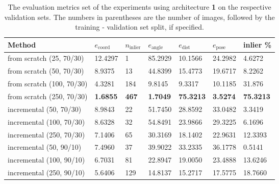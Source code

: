 \begin{table}[]
\centering
\begin{tabular}{l||llllll} 
Method                   & $e_{\text{coord}}$ & $n_{\text{inlier}}$ & $e_{\text{angle}}$ & $e_{\text{dist}}$ & $e_{\text{pose}}$  & inlier \% \\ \hline \hline 
from scratch (25, 70/30)        & 12.4297            & 1                   & 85.2929            & 10.1566           & 24.2982  & 4.6272          \\ \hline
from scratch (50, 70/30)        & 8.9375             & 13                  & 44.8399            & 15.4773           & 19.6717 & 8.2262          \\ \hline 
from scratch (100, 70/30)       & 4.3281             & 184                 & 9.8145             & 9.3317            & 10.1185    &31.876       \\ \hline
from scratch (250, 70/30)       & \textbf{1.6855}             & \textbf{467}                 & \textbf{1.7049}  &\textbf{75.3213}          & \textbf{3.5274}            & \textbf{75.3213}            \\ \hline \hline
incremental (50, 70/30)  & 8.9843            & 22                   & 51.7450           & 28.8592           & 33.0482  &3.3419         \\ \hline
incremental (100, 70/30) & 8.6328            & 32                  & 54.8491           & 23.9866           & 29.3225  &6.1696         \\ \hline 
incremental (250, 70/30) & 7.1406             & 65                  & 30.3169             & 18.1402           & 22.9631 &12.3393         \\ \hline \hline
incremental (50, 90/10)  & 7.4960            & 37                   & 39.9022           & 33.2335           & 36.1778  &0.5141        \\ \hline 
incremental (100, 90/10) & 6.7031             & 81                  & 22.8947            & 19.0050          & 23.4888  &13.6246        \\ \hline
incremental (250, 90/10) & 5.6406             & 129                 & 14.8137            & 15.2717            & 17.5775   &18.7660      
\end{tabular}
\caption{The evaluation metrics set of the experiments using architecture \textbf{1} on the respective validation sets. The numbers in parentheses are the number of images, followed by the training - validation set split, if specified.}
\label{table:experiments_online_sratch_arch1}
\end{table}

